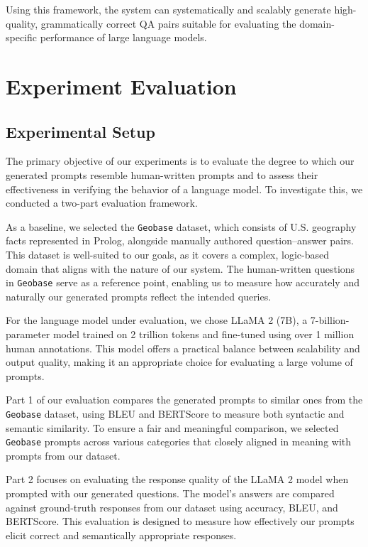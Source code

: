\documentclass{article}
\begin{document}
Using this framework, the system can systematically and scalably generate high-quality, 
grammatically correct QA pairs suitable for evaluating the domain-specific performance of large language models.

\section{Experiment Evaluation}

\subsection{Experimental Setup}

The primary objective of our experiments is to evaluate the degree to which our generated prompts 
resemble human-written prompts and to assess their effectiveness in verifying the behavior of a language model. 
To investigate this, we conducted a two-part evaluation framework.

As a baseline, we selected the \texttt{Geobase} dataset, which consists of U.S. geography facts represented in Prolog, 
alongside manually authored question–answer pairs. This dataset is well-suited to our goals, as it covers a complex, 
logic-based domain that aligns with the nature of our system. The human-written questions in \texttt{Geobase} serve as 
a reference point, enabling us to measure how accurately and naturally our generated prompts reflect the intended 
queries.

For the language model under evaluation, we chose LLaMA 2 (7B), a 7-billion-parameter model trained on 2 trillion 
tokens and fine-tuned using over 1 million human annotations. This model offers a practical balance between 
scalability and output quality, making it an appropriate choice for evaluating a large volume of prompts.

Part 1 of our evaluation compares the generated prompts to similar ones from the \texttt{Geobase} dataset, 
using BLEU and BERTScore to measure both syntactic and semantic similarity. To ensure a fair and meaningful 
comparison, we selected \texttt{Geobase} prompts across various categories that closely aligned in meaning with 
prompts from our dataset.

Part 2 focuses on evaluating the response quality of the LLaMA 2 model when prompted with our generated questions. 
The model's answers are compared against ground-truth responses from our dataset using accuracy, BLEU, and BERTScore. 
This evaluation is designed to measure how effectively our prompts elicit correct and semantically appropriate 
responses.  
\end{document}
